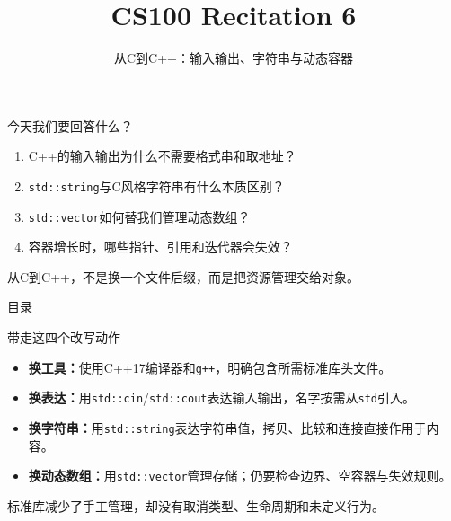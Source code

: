 \documentclass[red,tutorial,sectionpages,shtu]{vsp-beamer}
\title{CS100 Recitation 6}
\subtitle{从C到C++：输入输出、字符串与动态容器}
\begin{document}
\VSPtitleframe
\begin{frame}{今天我们要回答什么？}
    \begin{enumerate}
        \item C++的输入输出为什么不需要格式串和取地址？
        \item \texttt{std::string}与C风格字符串有什么本质区别？
        \item \texttt{std::vector}如何替我们管理动态数组？
        \item 容器增长时，哪些指针、引用和迭代器会失效？
    \end{enumerate}
    \medskip
    \alert{从C到C++，不是换一个文件后缀，而是把资源管理交给对象。}
\end{frame}
\begin{frame}{目录}
    \tableofcontents[hideallsubsections]
\end{frame}




\begin{frame}{带走这四个改写动作}
\begin{itemize}
\item \textbf{换工具：}使用C++17编译器和\texttt{g++}，明确包含所需标准库头文件。
\item \textbf{换表达：}用\texttt{std::cin}/\texttt{std::cout}表达输入输出，名字按需从\texttt{std}引入。
\item \textbf{换字符串：}用\texttt{std::string}表达字符串值，拷贝、比较和连接直接作用于内容。
\item \textbf{换动态数组：}用\texttt{std::vector}管理存储；仍要检查边界、空容器与失效规则。
\end{itemize}
\medskip\alert{标准库减少了手工管理，却没有取消类型、生命周期和未定义行为。}
\end{frame}
\VSPendframe{}
\end{document}
